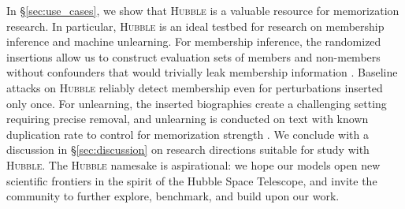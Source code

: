 \documentclass{article} %
\begin{document}
In \S\ref{sec:use_cases}, we show that \textsc{Hubble} is a valuable resource for memorization research. In particular, \textsc{Hubble} is an ideal testbed for research on membership inference and machine unlearning. For membership inference, the randomized insertions allow us to construct evaluation sets of members and non-members without confounders that would trivially leak membership information \citep{duan2024membershipinferenceattackswork}. Baseline attacks on \textsc{Hubble} reliably detect membership even for perturbations inserted only once. For unlearning, the inserted biographies create a challenging setting requiring precise removal, and unlearning is conducted on text with known duplication rate to control for memorization strength \citep{krishnan2025dataunlearnedequally}. We conclude with a discussion in \S\ref{sec:discussion} on research directions suitable for study with \textsc{Hubble}. The \textsc{Hubble} namesake is aspirational: we hope our models open new scientific frontiers in the spirit of the Hubble Space Telescope, and invite the community to further explore, benchmark, and build upon our work.





\end{document}
